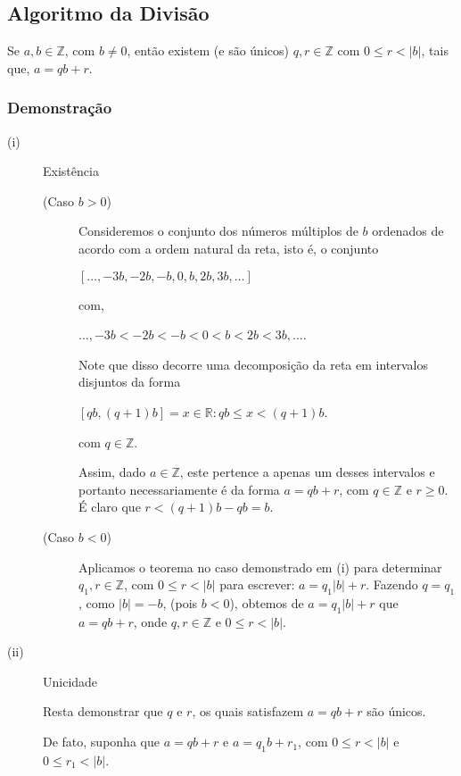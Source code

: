 \subsection*{Algoritmo da Divisão}
Se $a, b \in \mathbb{Z}$, com $b \neq 0$, então existem (e são únicos) $q, r \in  \mathbb{Z}$ com $0 \leq r < |b|$, tais que, $a = qb + r$.
\subsubsection*{Demonstração}
\begin{description}
    \item[(i)] Existência \newline
    \begin{description}
        \item[(Caso $b > 0$)]
        Consideremos o conjunto dos números múltiplos de $b$ ordenados de acordo com a ordem natural da reta, isto é, o conjunto

        $[\dots, -3b, -2b, -b, 0, b, 2b, 3b, \dots]$

        com,

        $\dots, -3b < -2b < -b < 0 < b < 2b < 3b, \dots$.

        Note que disso decorre uma decomposição da reta em intervalos disjuntos da forma

        $[qb, (q + 1)b] = {x \in \mathbb{R} : qb \leq x < (q + 1)b}$.

        com $q \in \mathbb{Z}$.

        Assim, dado $a \in \mathbb{Z}$, este pertence a apenas um desses intervalos e portanto necessariamente é da forma $a = qb + r$, com $q \in \mathbb{Z}$ e $r \geq 0$. É claro que $r < (q + 1)b - qb = b$.

        \item[(Caso $b < 0$)]
        Aplicamos o teorema no caso demonstrado em (i) para determinar $q_1, r \in \mathbb{Z}$, com $0 \leq r < |b|$ para escrever: $a = q_1|b| + r$. Fazendo $q = q_1$, como $|b| = -b$, (pois $b < 0$), obtemos de $a = q_1|b| + r$ que $a = qb + r$, onde $q, r \in \mathbb{Z}$ e $0 \leq r < |b|$.
    \end{description}
    \item[(ii)] Unicidade

    Resta demonstrar que $q$ e $r$, os quais satisfazem $a = qb + r$ são únicos.

    De fato, suponha que $a = qb + r$ e $a = q_1 b + r_1$, com $0 \leq r < |b|$ e $0 \leq r_1 < |b|$.


\end{description}
